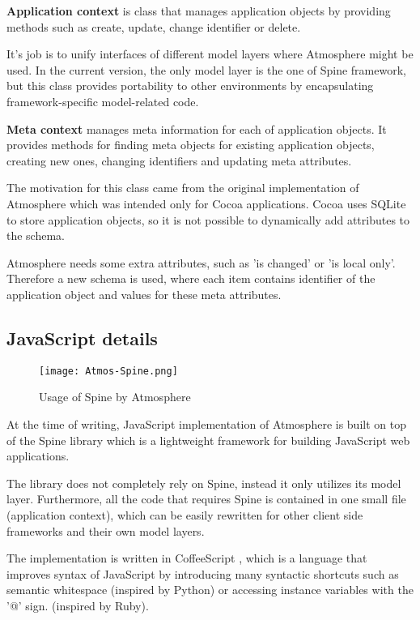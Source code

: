 \textbf{Application context} is class that manages application objects by providing methods such as create, update, change identifier or delete.

It's job is to unify interfaces of different model layers where Atmosphere might be used. In the current version, the only model layer is the one of Spine framework, but this class provides portability to other environments by encapsulating framework-specific model-related code.

\textbf{Meta context} manages meta information for each of application objects. It provides methods for finding meta objects for existing application objects, creating new ones, changing identifiers and updating meta attributes.

The motivation for this class came from the original implementation of Atmosphere which was intended only for Cocoa applications. Cocoa uses SQLite to store application objects, so it is not possible to dynamically add attributes to the schema.

Atmosphere needs some extra attributes, such as 'is changed' or 'is local only'. Therefore a new schema is used, where each item contains identifier of the application object and values for these meta attributes.

\subsection{JavaScript details}

\begin{figure}[htbp]
  \centering
    \texttt{[image: Atmos-Spine.png]}
  \caption{Usage of Spine by Atmosphere}
  \label{fig:figures_Atmos-Spine}
\end{figure}


At the time of writing, JavaScript implementation of Atmosphere is built on top of the Spine \citep{spinejs} library which is a lightweight framework for building JavaScript web applications.

The library does not completely rely on Spine, instead it only utilizes its model layer. Furthermore, all the code that requires Spine is contained in one small file (application context), which can be easily rewritten for other client side frameworks and their own model layers.

The implementation is written in CoffeeScript \citep{coffeescript}, which is a language that improves syntax of JavaScript by introducing many syntactic shortcuts such as semantic whitespace (inspired by Python) or accessing instance variables with the '@' sign. (inspired by Ruby).

